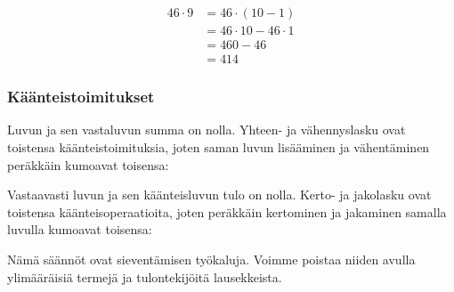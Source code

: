 \begin{esimerkki}
    \begin{align*}
46\cdot 9 &= 46\cdot (10-1) \\ &= 46\cdot 10 - 46\cdot 1 \\ &= 460-46 \\ &= 414
    \end{align*}
\end{esimerkki}

\subsubsection*{Käänteistoimitukset}

Luvun ja sen vastaluvun summa on nolla. Yhteen- ja vähennyslasku ovat toistensa käänteistoimituksia, joten saman
luvun lisääminen ja vähentäminen peräkkäin kumoavat toisensa:


Vastaavasti luvun ja sen käänteisluvun tulo on nolla. Kerto- ja jakolasku ovat toistensa käänteisoperaatioita, joten peräkkäin kertominen ja jakaminen samalla luvulla kumoavat toisensa:


Nämä säännöt ovat sieventämisen työkaluja. Voimme poistaa niiden avulla ylimääräisiä termejä ja tulontekijöitä lausekkeista.

\begin{esimerkki} 
    \begin{alakohdat}
    \end{alakohdat}
\end{esimerkki}

